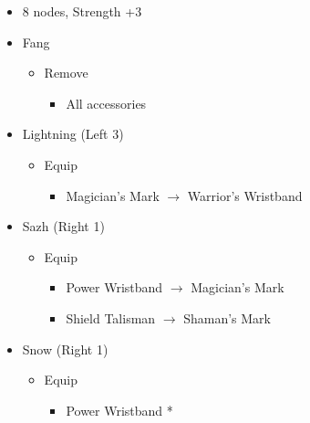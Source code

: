 \documentclass{report}
\begin{document}
\begin{menu}
\begin{itemize}
\begin{itemize}
\begin{itemize}
\begin{itemize}
                \item 8 nodes, Strength +3
            \end{itemize}
        \end{itemize}
    \end{itemize}
    \equip
    \begin{itemize}
        \item Fang
        \begin{itemize}
            \item Remove
            \begin{itemize}
                \item All accessories
            \end{itemize}
        \end{itemize}
        \item Lightning (Left 3)
        \begin{itemize}
            \item Equip
            \begin{itemize}
                \item Magician's Mark $\rightarrow$ Warrior's Wristband
            \end{itemize}
        \end{itemize}
        \item Sazh (Right 1)
        \begin{itemize}
            \item Equip
            \begin{itemize}
                \item Power Wristband $\rightarrow$ Magician's Mark
                \item Shield Talisman $\rightarrow$ Shaman's Mark
            \end{itemize}
        \end{itemize}
        \item Snow (Right 1)
        \begin{itemize}
            \item Equip
            \begin{itemize}
                \item Power Wristband *
            \end{itemize}
        \end{itemize}
    \end{itemize}
\end{itemize}
\end{menu}

\renewcommand{\first}{[1] Strike Team (\com/\syn/\com)}
\renewcommand{\second}{[2] Tri-Disaster (\rav/\rav/\rav)}
\renewcommand{\third}{[3] Strategic Warfare (\com/\syn/\sen)}
\renewcommand{\fourth}{[4] Tri-Disaster (\rav/\rav/\rav)}
\renewcommand{\fifth}{[5] Cerberus (\com/\com/\com)}
\renewcommand{\sixth}{[6] Cerberus (\com/\com/\com)}
\end{document}
